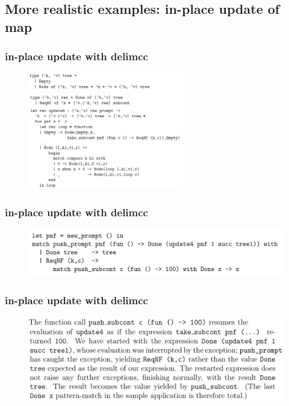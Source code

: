 \documentclass{beamer}
\begin{document}
  \subsection{More realistic examples: in-place update of map}
  \begin{frame}
    \frametitle{in-place update with delimcc}    
    \begin{figure}[ht]
      \begin{center}        
        \includegraphics[height=2in]{pipelinefigures/InplaceUpdateCodeSampleI.pdf}
      \end{center}      
    \end{figure}
  \end{frame}
  \begin{frame}
    \frametitle{in-place update with delimcc}    
    \begin{figure}[ht]
      \begin{center}        
        \includegraphics[width=\textwidth,height=0.8\textheight,keepaspectratio]{pipelinefigures/InplaceUpdateClientCode.pdf}
      \end{center}      
    \end{figure}
  \end{frame}
  \begin{frame}
    \frametitle{in-place update with delimcc}    
    \begin{figure}[ht]
      \begin{center}        
        \includegraphics[width=\textwidth,height=0.8\textheight,keepaspectratio]{pipelinefigures/InplaceUpdateExplanation.pdf}
      \end{center}      
    \end{figure}
  \end{frame}
\end{document}
